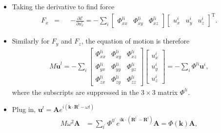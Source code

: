 \documentclass{beamer}
\newcommand*\vf[1]{\mathbf{#1}}
\begin{document}

\begin{frame}{}
\begin{itemize}
\item Taking the derivative to find force
\begin{align*}
F_x &=&&-\frac{\partial \mathcal{E}}{\partial u_x^l} = -\sum_i
\begin{bmatrix}
\Phi_{xx}^{li} & \Phi_{xy}^{li} & \Phi_{xz}^{li}
\end{bmatrix}
\begin{bmatrix}
u_x^i & u_y^i & u_z^i
\end{bmatrix}^\text{T}.
\end{align*}
\item Similarly for $F_y$ and $F_z$, the equation of motion is therefore
\begin{align}
\boxed{M \ddot{\vf{u}}^l = -\sum_i
\begin{bmatrix}
\Phi_{xx}^{li} & \Phi_{xy}^{li} & \Phi_{xz}^{li} \\
\Phi_{yx}^{li} & \Phi_{yy}^{li} & \Phi_{yz}^{li} \\
\Phi_{zx}^{li} & \Phi_{zy}^{li} & \Phi_{zz}^{li}
\end{bmatrix}
\begin{bmatrix}
u_x^i \\
u_y^i \\
u_z^i
\end{bmatrix} = -\sum_i \Phi^{li} \vf{u}^i}, \label{eq:phonon_motion}
\end{align}
where the subscripts are suppressed in the $3 \times 3$ matrix $\Phi^{li}$.
\item Plug in, $\vf{u}^l = \vf{A} e^{i (\vf{k} \cdot \vf{R}^l - \omega t)}$
\begin{align}
M \omega^2 \vf{A} &= \sum_{l^{\prime}} \Phi^{l l^{\prime}} e^{i \vf{k} \cdot (\vf{R}^{l^{\prime}} - \vf{R}^l)} \vf{A} = \Phi(\vf{k}) \vf{A}, \label{eq:phonon_motion_matrix}
\end{align}
\end{itemize}
\end{frame}
\end{document}
